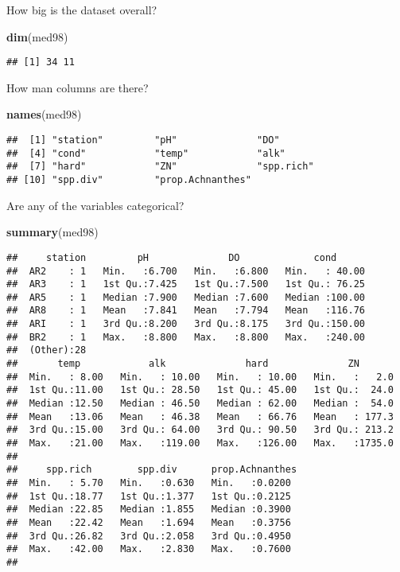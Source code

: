 \documentclass[]{book}
\newenvironment{Shaded}{\begin{snugshade}}{\end{snugshade}}
\newcommand{\KeywordTok}[1]{\textcolor[rgb]{0.13,0.29,0.53}{\textbf{#1}}}
\newcommand{\NormalTok}[1]{#1}
\theoremstyle{definition}
\theoremstyle{definition}
\theoremstyle{definition}
\theoremstyle{remark}
\begin{document}
How big is the dataset overall?

\begin{Shaded}
\begin{Highlighting}[]
\KeywordTok{dim}\NormalTok{(med98)}
\end{Highlighting}
\end{Shaded}

\begin{verbatim}
## [1] 34 11
\end{verbatim}

How man columns are there?

\begin{Shaded}
\begin{Highlighting}[]
\KeywordTok{names}\NormalTok{(med98)}
\end{Highlighting}
\end{Shaded}

\begin{verbatim}
##  [1] "station"         "pH"              "DO"             
##  [4] "cond"            "temp"            "alk"            
##  [7] "hard"            "ZN"              "spp.rich"       
## [10] "spp.div"         "prop.Achnanthes"
\end{verbatim}

Are any of the variables categorical?

\begin{Shaded}
\begin{Highlighting}[]
\KeywordTok{summary}\NormalTok{(med98)}
\end{Highlighting}
\end{Shaded}

\begin{verbatim}
##     station         pH              DO             cond       
##  AR2    : 1   Min.   :6.700   Min.   :6.800   Min.   : 40.00  
##  AR3    : 1   1st Qu.:7.425   1st Qu.:7.500   1st Qu.: 76.25  
##  AR5    : 1   Median :7.900   Median :7.600   Median :100.00  
##  AR8    : 1   Mean   :7.841   Mean   :7.794   Mean   :116.76  
##  ARI    : 1   3rd Qu.:8.200   3rd Qu.:8.175   3rd Qu.:150.00  
##  BR2    : 1   Max.   :8.800   Max.   :8.800   Max.   :240.00  
##  (Other):28                                                   
##       temp            alk              hard              ZN        
##  Min.   : 8.00   Min.   : 10.00   Min.   : 10.00   Min.   :   2.0  
##  1st Qu.:11.00   1st Qu.: 28.50   1st Qu.: 45.00   1st Qu.:  24.0  
##  Median :12.50   Median : 46.50   Median : 62.00   Median :  54.0  
##  Mean   :13.06   Mean   : 46.38   Mean   : 66.76   Mean   : 177.3  
##  3rd Qu.:15.00   3rd Qu.: 64.00   3rd Qu.: 90.50   3rd Qu.: 213.2  
##  Max.   :21.00   Max.   :119.00   Max.   :126.00   Max.   :1735.0  
##                                                                    
##     spp.rich        spp.div      prop.Achnanthes 
##  Min.   : 5.70   Min.   :0.630   Min.   :0.0200  
##  1st Qu.:18.77   1st Qu.:1.377   1st Qu.:0.2125  
##  Median :22.85   Median :1.855   Median :0.3900  
##  Mean   :22.42   Mean   :1.694   Mean   :0.3756  
##  3rd Qu.:26.82   3rd Qu.:2.058   3rd Qu.:0.4950  
##  Max.   :42.00   Max.   :2.830   Max.   :0.7600  
## 
\end{verbatim}
\end{document}
